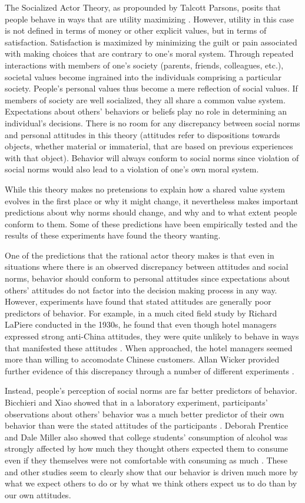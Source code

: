 \documentclass[rutwik_proposal.tex]{subfiles}
\begin{document}
The Socialized Actor Theory, as propounded by Talcott Parsons, posits that people behave in ways that are utility maximizing \cite{Parsons51}. However, utility in this case is not defined in terms of money or other explicit values, but in terms of satisfaction. Satisfaction is maximized by minimizing the guilt or pain associated with making choices that are contrary to one's moral system. Through repeated interactions with members of one's society (parents, friends, colleagues, etc.), societal values become ingrained into the individuals comprising a particular society. People's personal values thus become a mere reflection of social values. If members of society are well socialized, they all share a common value system. Expectations about others' behaviors or beliefs play no role in determining an individual's decisions. There is no room for any discrepancy between social norms and personal attitudes in this theory (attitudes refer to dispositions towards objects, whether material or immaterial, that are based on previous experiences with that object). Behavior will always conform to social norms since violation of social norms would also lead to a violation of one's own moral system.

While this theory makes no pretensions to explain how a shared value system evolves in the first place or why it might change, it nevertheless makes important predictions about why norms should change, and why and to what extent people conform to them. Some of these predictions have been empirically tested and the results of these experiments have found the theory wanting.

One of the predictions that the rational actor theory makes is that even in situations where there is an observed discrepancy between attitudes and social norms, behavior should conform to personal attitudes since expectations about others' attitudes do not factor into the decision making process in any way. However, experiments have found that stated attitudes are generally poor predictors of behavior. For example, in a much cited field study by Richard LaPiere conducted in the 1930s, he found that even though hotel managers expressed strong anti-China attitudes, they were quite unlikely to behave in ways that manifested these attitudes \cite{LaPiere34}. When approached, the hotel managers seemed more than willing to accomodate Chinese customers. Allan Wicker provided further evidence of this discrepancy through a number of different experiments \cite{Wicker69}.

Instead, people's perception of social norms are far better predictors of behavior. Bicchieri and Xiao showed that in a laboratory experiment, participants' observations about others' behavior was a much better predictor of their own behavior than were the stated attitudes of the participants \cite{Bicchieri09}. Deborah Prentice and Dale Miller also showed that college students' consumption of alcohol was strongly affected by how much they thought others expected them to consume even if they themselves were not comfortable with consuming as much \cite{Prentice93}. These and other studies seem to clearly show that our behavior is driven much more by what we expect others to do or by what we think others expect us to do than by our own attitudes.
\end{document}

